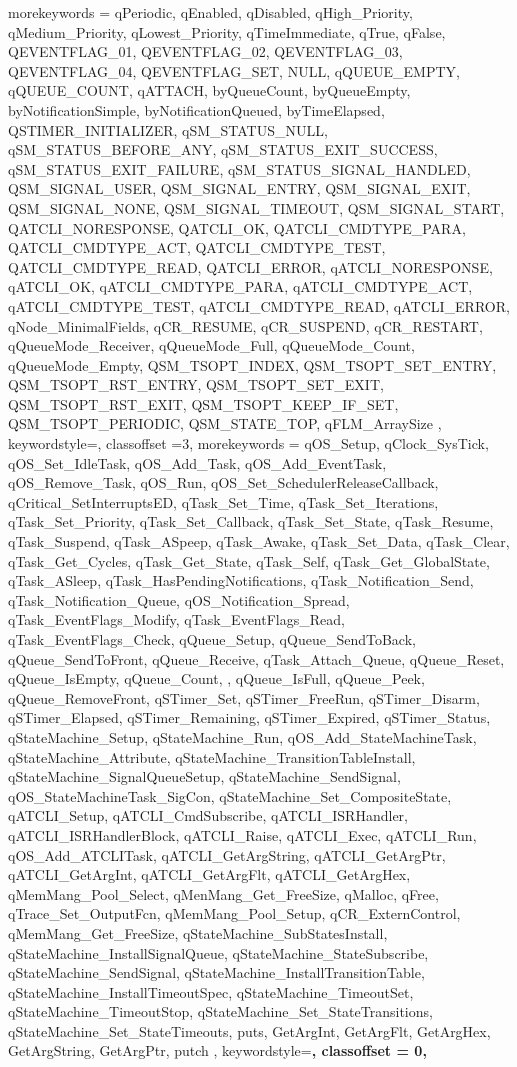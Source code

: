 {    morekeywords = { qPeriodic, qEnabled, qDisabled, qHigh_Priority, qMedium_Priority, qLowest_Priority, qTimeImmediate, qTrue, qFalse, QEVENTFLAG_01, QEVENTFLAG_02, QEVENTFLAG_03, QEVENTFLAG_04, QEVENTFLAG_SET, NULL, qQUEUE_EMPTY, qQUEUE_COUNT, qATTACH, byQueueCount, byQueueEmpty, byNotificationSimple, byNotificationQueued, byTimeElapsed, QSTIMER_INITIALIZER, qSM_STATUS_NULL, qSM_STATUS_BEFORE_ANY, qSM_STATUS_EXIT_SUCCESS, qSM_STATUS_EXIT_FAILURE, qSM_STATUS_SIGNAL_HANDLED, QSM_SIGNAL_USER, QSM_SIGNAL_ENTRY, QSM_SIGNAL_EXIT, QSM_SIGNAL_NONE, QSM_SIGNAL_TIMEOUT, QSM_SIGNAL_START, QATCLI_NORESPONSE, QATCLI_OK, QATCLI_CMDTYPE_PARA, QATCLI_CMDTYPE_ACT, QATCLI_CMDTYPE_TEST, QATCLI_CMDTYPE_READ, QATCLI_ERROR, qATCLI_NORESPONSE, qATCLI_OK, qATCLI_CMDTYPE_PARA, qATCLI_CMDTYPE_ACT, qATCLI_CMDTYPE_TEST, qATCLI_CMDTYPE_READ, qATCLI_ERROR, qNode_MinimalFields, qCR_RESUME, qCR_SUSPEND, qCR_RESTART, qQueueMode_Receiver, qQueueMode_Full, qQueueMode_Count, qQueueMode_Empty, QSM_TSOPT_INDEX, QSM_TSOPT_SET_ENTRY, QSM_TSOPT_RST_ENTRY, QSM_TSOPT_SET_EXIT, QSM_TSOPT_RST_EXIT, QSM_TSOPT_KEEP_IF_SET, QSM_TSOPT_PERIODIC, QSM_STATE_TOP, qFLM_ArraySize },    
    keywordstyle=\color{teal},    
    classoffset =3,
    morekeywords = {qOS_Setup, qClock_SysTick, qOS_Set_IdleTask, qOS_Add_Task, qOS_Add_EventTask, qOS_Remove_Task, qOS_Run, qOS_Set_SchedulerReleaseCallback, qCritical_SetInterruptsED, qTask_Set_Time, qTask_Set_Iterations, qTask_Set_Priority, qTask_Set_Callback, qTask_Set_State, qTask_Resume, qTask_Suspend, qTask_ASpeep, qTask_Awake, qTask_Set_Data, qTask_Clear, qTask_Get_Cycles, qTask_Get_State, qTask_Self, qTask_Get_GlobalState, qTask_ASleep, qTask_HasPendingNotifications, qTask_Notification_Send, qTask_Notification_Queue, qOS_Notification_Spread, qTask_EventFlags_Modify, qTask_EventFlags_Read, qTask_EventFlags_Check, qQueue_Setup, qQueue_SendToBack, qQueue_SendToFront, qQueue_Receive, qTask_Attach_Queue, qQueue_Reset, qQueue_IsEmpty, qQueue_Count, , qQueue_IsFull, qQueue_Peek, qQueue_RemoveFront, qSTimer_Set, qSTimer_FreeRun, qSTimer_Disarm, qSTimer_Elapsed, qSTimer_Remaining, qSTimer_Expired, qSTimer_Status, qStateMachine_Setup, qStateMachine_Run, qOS_Add_StateMachineTask, qStateMachine_Attribute, qStateMachine_TransitionTableInstall, qStateMachine_SignalQueueSetup, qStateMachine_SendSignal, qOS_StateMachineTask_SigCon, qStateMachine_Set_CompositeState, qATCLI_Setup, qATCLI_CmdSubscribe, qATCLI_ISRHandler, qATCLI_ISRHandlerBlock, qATCLI_Raise, qATCLI_Exec, qATCLI_Run, qOS_Add_ATCLITask, qATCLI_GetArgString, qATCLI_GetArgPtr, qATCLI_GetArgInt, qATCLI_GetArgFlt, qATCLI_GetArgHex, qMemMang_Pool_Select, qMenMang_Get_FreeSize, qMalloc, qFree, qTrace_Set_OutputFcn, qMemMang_Pool_Setup, qCR_ExternControl, qMemMang_Get_FreeSize, qStateMachine_SubStatesInstall, qStateMachine_InstallSignalQueue, qStateMachine_StateSubscribe, qStateMachine_SendSignal, qStateMachine_InstallTransitionTable, qStateMachine_InstallTimeoutSpec, qStateMachine_TimeoutSet, qStateMachine_TimeoutStop, qStateMachine_Set_StateTransitions, qStateMachine_Set_StateTimeouts, puts, GetArgInt, GetArgFlt, GetArgHex, GetArgString, GetArgPtr, putch },
    keywordstyle=\bfseries,
    classoffset = 0,
}